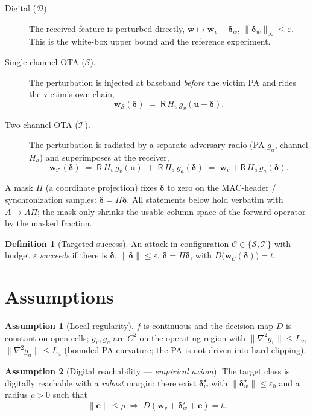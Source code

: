 \documentclass[11pt]{article}
\theoremstyle{definition}
\newtheorem{definition}[theorem]{Definition}
\newtheorem{assumption}{Assumption}
\newcommand{\norm}[1]{\lVert #1 \rVert}
\newcommand{\Rx}{\mathsf{R}}
\newcommand{\bu}{\bm{u}}
\newcommand{\bw}{\bm{w}}
\newcommand{\bd}{\bm{\delta}}
\begin{document}
\begin{description}
\item[Digital ($\mathcal{D}$).] The received feature is perturbed directly,
  $\bw \mapsto \bw_v + \bd_w$, $\norm{\bd_w}_\infty\le\varepsilon$. This is the white-box upper
  bound and the reference experiment.
\item[Single-channel OTA ($\mathcal{S}$).] The perturbation is injected at baseband
  \emph{before} the victim PA and rides the victim's own chain,
  \begin{equation}\label{eq:sc}
    \bw_{\mathcal S}(\bd) \;=\; \Rx\,H_v\,g_v(\bu+\bd).
  \end{equation}
\item[Two-channel OTA ($\mathcal{T}$).] The perturbation is radiated by a separate adversary
  radio (PA $g_a$, channel $H_a$) and superimposes at the receiver,
  \begin{equation}\label{eq:2ch}
    \bw_{\mathcal T}(\bd) \;=\; \Rx\,H_v\,g_v(\bu) \;+\; \Rx\,H_a\,g_a(\bd)
    \;=\; \bw_v + \Rx\,H_a\,g_a(\bd).
  \end{equation}
\end{description}

A mask $\Pi$ (a coordinate projection) fixes $\bd$ to zero on the MAC-header / synchronization
samples: $\bd=\Pi\bd$. All statements below hold verbatim with $A\mapsto A\Pi$; the mask only
shrinks the usable column space of the forward operator by the masked fraction.

\begin{definition}[Targeted success]
An attack in configuration $\mathcal C\in\{\mathcal S,\mathcal T\}$ with budget $\varepsilon$
\emph{succeeds} if there is $\bd$, $\norm{\bd}\le\varepsilon$, $\bd=\Pi\bd$, with
$D\!\big(\bw_{\mathcal C}(\bd)\big)=t$.
\end{definition}

\section{Assumptions}

\begin{assumption}[Local regularity]\label{as:smooth}
$f$ is continuous and the decision map $D$ is constant on open cells; $g_v,g_a$ are $C^2$ on
the operating region with $\norm{\nabla^2 g_v}\le L_v$, $\norm{\nabla^2 g_a}\le L_a$ (bounded PA
curvature; the PA is not driven into hard clipping).
\end{assumption}

\begin{assumption}[Digital reachability --- \emph{empirical axiom}]\label{as:reach}
The target class is digitally reachable with a \emph{robust} margin: there exist
$\bd_w^\star$ with $\norm{\bd_w^\star}\le\varepsilon_0$ and a radius $\rho>0$ such that
\[
  \norm{\bm e}\le\rho \;\Longrightarrow\; D(\bw_v+\bd_w^\star+\bm e)=t .
\]
\end{assumption}
\end{document}
